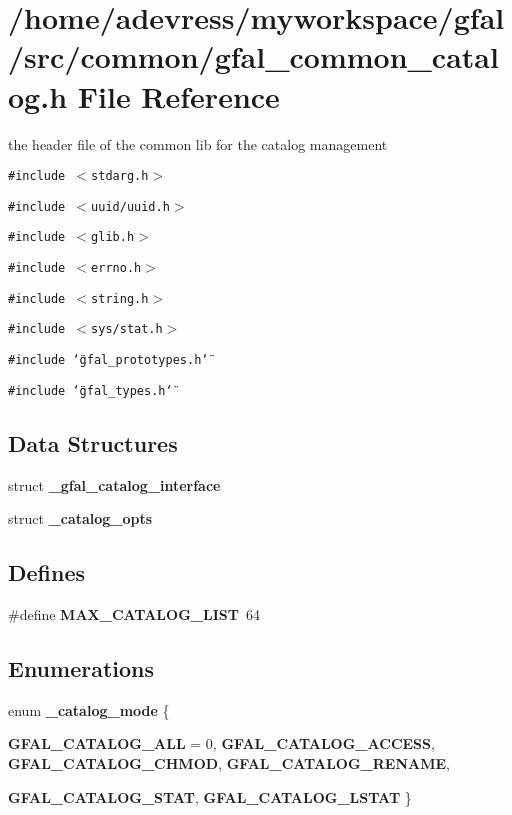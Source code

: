 \section{/home/adevress/myworkspace/gfal/src/common/gfal\_\-common\_\-catalog.h File Reference}
\label{gfal__common__catalog_8h}
the header file of the common lib for the catalog management 

{\tt \#include $<$stdarg.h$>$}\par
{\tt \#include $<$uuid/uuid.h$>$}\par
{\tt \#include $<$glib.h$>$}\par
{\tt \#include $<$errno.h$>$}\par
{\tt \#include $<$string.h$>$}\par
{\tt \#include $<$sys/stat.h$>$}\par
{\tt \#include \char`\"{}gfal\_\-prototypes.h\char`\"{}}\par
{\tt \#include \char`\"{}gfal\_\-types.h\char`\"{}}\par
\subsection*{Data Structures}
\begin{CompactItemize}
\item 
struct \textbf{\_\-gfal\_\-catalog\_\-interface}
\item 
struct \bf{\_\-catalog\_\-opts}
\end{CompactItemize}
\subsection*{Defines}
\begin{CompactItemize}
\item 
\#define \textbf{MAX\_\-CATALOG\_\-LIST}~64\label{gfal__common__catalog_8h_c39f705683e893b91f559704ee2a707e}

\end{CompactItemize}
\subsection*{Enumerations}
\begin{CompactItemize}
\item 
enum \textbf{\_\-catalog\_\-mode} \{ \par
\textbf{GFAL\_\-CATALOG\_\-ALL} = 0, 
\textbf{GFAL\_\-CATALOG\_\-ACCESS}, 
\textbf{GFAL\_\-CATALOG\_\-CHMOD}, 
\textbf{GFAL\_\-CATALOG\_\-RENAME}, 
\par
\textbf{GFAL\_\-CATALOG\_\-STAT}, 
\textbf{GFAL\_\-CATALOG\_\-LSTAT}
 \}
\end{CompactItemize}

